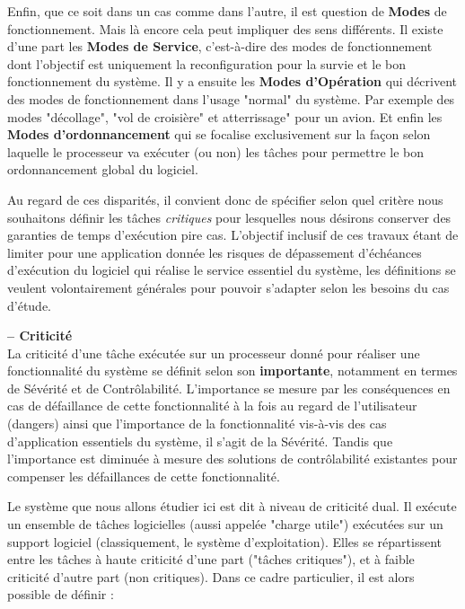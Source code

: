\documentclass[french, a4paper, 11pt, twoside, pdftex]{StyleThese}
\begin{document}
    Enfin, que ce soit dans un cas comme dans l'autre, il est question de \textbf{Modes} de fonctionnement. Mais là encore cela peut impliquer des sens différents. Il existe d'une part les \textbf{Modes de Service}, c'est-à-dire des modes de fonctionnement dont l'objectif est uniquement la reconfiguration pour la survie et le bon fonctionnement du système. Il y a ensuite les \textbf{Modes d'Opération} qui décrivent des modes de fonctionnement dans l'usage "normal" du système. Par exemple des modes "décollage", "vol de croisière" et atterrissage" pour un avion. Et enfin les \textbf{Modes d'ordonnancement} qui se focalise exclusivement sur la façon selon laquelle le processeur va exécuter (ou non) les tâches pour permettre le bon ordonnancement global du logiciel.
    
	Au regard de ces disparités, il convient donc de spécifier selon quel critère nous souhaitons définir les tâches \textit{critiques} pour lesquelles nous désirons conserver des garanties de temps d'exécution pire cas. L'objectif inclusif de ces travaux étant de limiter pour une application donnée les risques de dépassement d'échéances d'exécution du logiciel qui réalise le service essentiel du système, les définitions se veulent volontairement générales pour pouvoir s'adapter selon les besoins du cas d'étude.
	
	\begin{definition}\textbf{ -- Criticité} \\
		La criticité d'une tâche exécutée sur un processeur donné pour réaliser une fonctionnalité du système se définit selon son \textbf{importante}, notamment en termes de Sévérité et de Contrôlabilité. L'importance se mesure par les conséquences en cas de défaillance de cette fonctionnalité à la fois au regard de l'utilisateur (dangers) ainsi que l'importance de la fonctionnalité vis-à-vis des cas d'application essentiels du système, il s'agit de la Sévérité. Tandis que l'importance est diminuée à mesure des solutions de contrôlabilité existantes pour compenser les défaillances de cette fonctionnalité.
	\end{definition}

    Le système que nous allons étudier ici est dit à niveau de criticité dual. Il exécute un ensemble de tâches logicielles (aussi appelée "charge utile") exécutées sur un support logiciel (classiquement, le système d'exploitation). Elles se répartissent entre les tâches à haute criticité d'une part ("tâches critiques"), et à faible criticité d'autre part (non critiques). 	Dans ce cadre particulier, il est alors possible de définir : 
    
\end{document}
